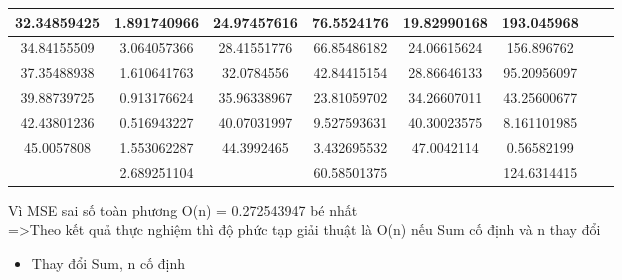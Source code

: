 \documentclass{article}
\begin{document}
\begin{flushleft}
\begin{adjustbox}{width=1.1\textwidth,center=\textwidth}
\begin{tabular}{|c|c|c|c|c|c|c|c|}
        32.34859425	&1.891740966	&24.97457616	&76.5524176	    &19.82990168&	193.045968\\\hline
        34.84155509	&3.064057366	&28.41551776	&66.85486182	&24.06615624&	156.896762\\\hline
        37.35488938	&1.610641763	&32.0784556	    &42.84415154	&28.86646133&	95.20956097\\\hline
        39.88739725	&0.913176624	&35.96338967	&23.81059702	&34.26607011&	43.25600677\\\hline
        42.43801236	&0.516943227	&40.07031997	&9.527593631	&40.30023575&	8.161101985\\\hline
        45.0057808	&1.553062287	&44.3992465	    &3.432695532	&47.0042114	&0.56582199\\

        \hline
        {}&	2.689251104
&{}&60.58501375
&{}&124.6314415
\\
        \hline
        \end{tabular}
        \end{adjustbox}
    \end{flushleft}
    
    Vì MSE sai số toàn phương O(n) = 0.272543947 bé nhất\\
    =>Theo kết quả thực nghiệm thì độ phức tạp giải thuật là  O(n) nếu Sum cố định và n thay đổi
    
    \begin{itemize}
    \item     Thay đổi Sum, n cố định
    \end{itemize}
    
\end{document}
